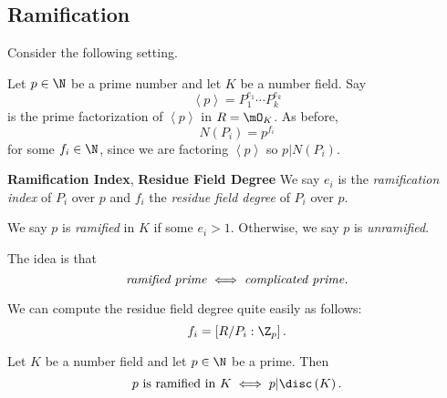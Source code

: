 \documentclass[pmath441]{subfiles}
\begin{document}
\begin{answer}
        \noindent
        \begin{minipage}{\textwidth}
        \end{minipage}
    \end{answer}
    
    \subsection{Ramification}

    Consider the following setting.

    Let $p\in\N$ be a prime number and let $K$ be a number field. Say
    \begin{equation*}
        \left< p \right> = P_1^{e_1}\cdots P_k^{e_k} 
    \end{equation*}
    is the prime factorization of $\left< p \right>$ in $R=\mO_K$. As before,
    \begin{equation*}
        N\left( P_i \right) = p^{f_i}
    \end{equation*}
    for some $f_i\in\N$, since we are factoring $\left< p \right>$ so $p|N\left( P_i \right)$. 

    \begin{definition}{\textbf{Ramification Index}, \textbf{Residue Field Degree}}
        We say $e_i$ is the \emph{ramification index} of $P_i$ over $p$ and $f_i$ the \emph{residue field degree} of $P_i$ over $p$.

        We say $p$ is \emph{ramified} in $K$ if some $e_i>1$. Otherwise, we say $p$ is \emph{unramified}.
    \end{definition}

    \np The idea is that
    \begin{equation*}
        \text{\textit{ramified prime}} \iff \text{\textit{complicated prime}}.
    \end{equation*}

    \np We can compute the residue field degree quite easily as follows:
    \begin{equation*}
        f_i = \left[ R /P_i:\Z_p \right].
    \end{equation*}
    
    \clearpage

    \begin{theorem}{}
        Let $K$ be a number field and let $p\in\N$ be a prime. Then
        \begin{equation*}
            \text{$p$ is ramified in $K$} \iff p|\disc\left( K \right).
        \end{equation*}
    \end{theorem}
\end{document}
